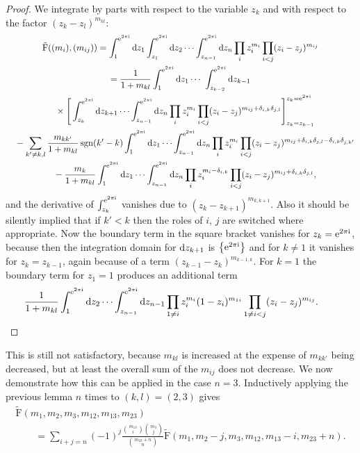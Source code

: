 \documentclass[pdftex]{sigma}%
\numberwithin{equation}{section}
\renewcommand{\i}{\mathrm{i}}
\renewcommand{\d}{\mathrm{d}}
\newcommand{\rFp}{\tilde{\mathrm{F}}}
\begin{document}
\begin{proof}We integrate by parts with respect to the variable $z_k$ and with
respect to the factor $(z_k-z_l)^{m_{kl}}$:
\begin{gather*}
\rFp((m_i),(m_{ij}))
=\int_1^{{\rm e}^{2\pi\i }}\d z_1 \int_{z_1}^{{\rm e}^{2\pi\i }}\d z_2\cdots\int_{z_{n-1}}^{{\rm e}^{2\pi\i }}\d z_n\prod_i
z_i^{m_i}\prod_{i<j}(z_i - z_j)^{m_{ij}}\\
=\frac{1}{1+m_{kl}}\int_1^{{\rm e}^{2\pi\i }}\d z_1\cdots 
\int_{z_{k-2}}^{{\rm e}^{2\pi\i }}\d z_{k-1}\\
\quad {} \times\Bigg[\int_{z_k}^{{\rm e}^{2\pi\i }}\d z_{k+1}\cdots\int_{z_{n-1}}^{{\rm e}^{2\pi\i }}\d z_n \prod_i
z_i^{m_i}\prod_{i<j}(z_i - z_j)^{m_{ij}+\delta_{i,k}\delta_{j,l}}\Bigg]_{z_k=z_{k-1}}^{z_k={\rm e}^{2\pi\i }}\\
\quad{} -\sum_{k'\neq k,l} \frac{m_{kk'}}{1+m_{kl}}\operatorname{sgn}(k'-k)
\int_1^{{\rm e}^{2\pi\i }}\d z_1 \cdots \int_{z_{n-1}}^{{\rm e}^{2\pi\i }}\d z_n \prod_i
z_i^{m_i}\prod_{i<j}(z_i -z_j)^{m_{ij}+\delta_{i,k}\delta_{j,l}-\delta_{i,k}\delta_{j,k'}} \\
\quad{}-\frac{m_{k}}{1+m_{kl}}\int_1^{{\rm e}^{2\pi\i }}\d z_1\cdots
\int_{z_{n-1}}^{{\rm e}^{2\pi\i }}\d z_n \prod_i z_i^{m_i-\delta_{i,k}}\prod_{i<j}(z_i -z_j)^{m_{ij}+\delta_{i,k}\delta_{j,l}},
\end{gather*}
and the derivative of $\int_{z_k}^{{\rm e}^{2\pi\i}}$ vanishes due to $(z_k-z_{k+1})^{m_{k,k+1}}$. Also it should be silently implied that if $k'<k$ then the roles of $i$, $j$ are switched where appropriate. Now the boundary term in the square bracket vanishes for $z_k={\rm e}^{2\pi\i}$, because then the integration domain for ${\rm d}z_{k+1}$ is $\big\{{\rm e}^{2\pi\i }\big\}$ and for $k\neq 1$ it vanishes for $z_k=z_{k-1}$, again because of a term $(z_{k-1}-z_k)^{m_{k-1,k}}$. For $k=1$ the boundary term for $z_1=1$ produces an additional term
\[
\frac{1}{1+m_{kl}}\int_1^{{\rm e}^{2\pi\i }}\d z_2\cdots \int_{z_{n-1}}^{{\rm e}^{2\pi\i }}\d z_{n-1} \prod_{1\neq i}
z_i^{m_i}(1-z_i)^{m_{1i}}\prod_{1\neq i<j}(z_i - z_j)^{m_{ij}}.\tag*{\qed}
\]\renewcommand{\qed}{}
\end{proof}

This is still not satisfactory, because $m_{kl}$ is increased at the
expense of $m_{kk'}$ being decreased, but at least the overall sum of
the $m_{ij}$ does not decrease. We now demonstrate how this can be
applied in the case $n=3$. Inductively applying the previous lemma $n$
times to $(k,l)=(2,3)$ gives
\begin{gather*}
\rFp(m_1,m_2,m_3,m_{12},m_{13},m_{23})\\
\qquad =\sum_{i+j=n}(-1)^j\frac{{m_{13} \choose i}{m_{3} \choose j}}{{m_{23}+n
\choose n}}\rFp(m_1,m_2-j,m_3,m_{12},m_{13}-i,m_{23}+n).
\end{gather*}
\end{document}
